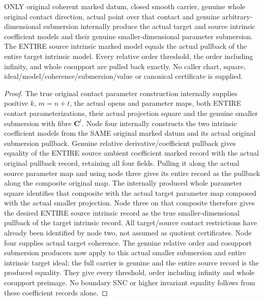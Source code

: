 \begin{theorem}
\label{hir:submersion-contact-param-coeff-internal-whole-square}
\leanok
ONLY original coherent marked datum, closed smooth carrier, genuine whole
original contact direction, actual point over that contact and genuine
arbitrary-dimensional submersion internally produce the actual target and
source intrinsic coefficient models and their genuine smaller-dimensional
parameter submersion. The ENTIRE source intrinsic marked model equals the
actual pullback of the entire target intrinsic model. Every relative order
threshold, the order including infinity, and whole cosupport are pulled back
exactly. No caller chart, square, ideal/model/coherence/submersion/value or
canonical certificate is supplied.
\end{theorem}
\begin{proof}
The true original contact parameter construction internally supplies positive
$k$, $m=n+t$, the actual opens and parameter maps, both ENTIRE contact
parameterizations, their actual projection square and the genuine smaller
submersion with fibre $\mathbf C^t$. Node four internally constructs the two
intrinsic coefficient models from the SAME original marked datum and its
actual original submersion pullback. Genuine relative derivative/coefficient
pullback gives equality of the ENTIRE source ambient coefficient marked
record with the actual original pullback record, retaining all four fields.
Pulling it along the actual source parameter map and using node three gives
its entire record as the pullback along the composite original map. The
internally produced whole parameter square identifies that composite with
the actual target parameter map composed with the actual smaller projection.
Node three on that composite therefore gives the desired ENTIRE source
intrinsic record as the true smaller-dimensional pullback of the target
intrinsic record. All target/source contact restrictions have already been
identified by node two, not assumed as quotient certificates. Node four
supplies actual target coherence. The genuine relative order and cosupport
submersion producers now apply to this actual smaller submersion and entire
intrinsic target ideal; the full carrier is genuine and the entire source
record is the produced equality. They give every threshold, order including
infinity and whole cosupport preimage. No boundary SNC or higher invariant
equality follows from these coefficient records alone.
\end{proof}

